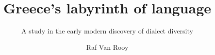 \author{Raf Van Rooy}
\title{Greece’s labyrinth of language}
\subtitle{A study in the early modern discovery of dialect diversity}
\renewcommand{\lsSeries}{hpls}
\renewcommand{\lsSeriesNumber}{2}
\renewcommand{\lsID}{253}
\dedication{To my parents, whose love speaks its own dialect}

\renewcommand{\lsISBNdigital}{978-3-96110-210-5}
\renewcommand{\lsISBNhardcover}{978-3-96110-211-2}
